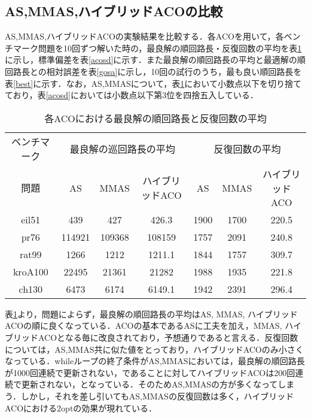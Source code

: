 \documentclass[a4j]{jsarticle}
\begin{document}
\subsection{AS,MMAS,ハイブリッドACOの比較}
AS,MMAS,ハイブリッドACOの実験結果を比較する．各ACOを用いて，各ベンチマーク問題を10回ずつ解いた時の，最良解の順回路長・反復回数の平均を表\ref{acoave}に示し，標準偏差を表\ref{acosd}に示す．また最良解の順回路長の平均と最適解の順回路長との相対誤差を表\ref{gosa}に示し，10回の試行のうち，最も良い順回路長を表\ref{best}に示す．なお，AS,MMASについて，表\ref{acoave}において小数点以下を切り捨てており，表\ref{acosd}においては小数点以下第3位を四捨五入している．
\begin{table}[htb]
 \begin{center}
  \caption{各ACOにおける最良解の順回路長と反復回数の平均}
  \label{acoave}
  \begin{tabular}[tb]{|c||c|c|c||c|c|c|} \hline
 ベンチマーク& \multicolumn{3}{|c||}{最良解の巡回路長の平均}& \multicolumn{3}{|c|}{反復回数の平均} \\\cline{2-7}
 問題 & AS & MMAS & ハイブリッドACO & AS & MMAS & ハイブリッドACO \\\hline
eil51 & 439 & 427 & 426.3 & 1900 & 1700 & 220.5 \\\hline
pr76 & 114921 & 109368 & 108159 & 1757 & 2091 & 240.8 \\\hline
rat99 & 1266 & 1212 & 1211.1 & 1844 & 1757 & 309.7 \\\hline
kroA100 & 22495 & 21361 & 21282 & 1988 & 1935 & 221.8 \\\hline
ch130 & 6473 & 6174 & 6149.1 & 1942 & 2391 & 296.4 \\\hline
  \end{tabular}
 \end{center}
\end{table}
\par
表\ref{acoave}より，問題によらず，最良解の順回路長の平均はAS, MMAS, ハイブリッドACOの順に良くなっている．ACOの基本であるASに工夫を加え，MMAS, ハイブリッドACOとなる毎に改良されており，予想通りであると言える．反復回数については，AS,MMAS共に似た値をとっており，ハイブリッドACOのみ小さくなっている．whileループの終了条件がAS,MMASにおいては，最良解の順回路長が1000回連続で更新されない，であることに対してハイブリッドACOは200回連続で更新されない，となっている．そのためAS,MMASの方が多くなってしまう．しかし，それを差し引いてもAS,MMASの反復回数は多く，ハイブリッドACOにおける2optの効果が現れている．
\end{document}
